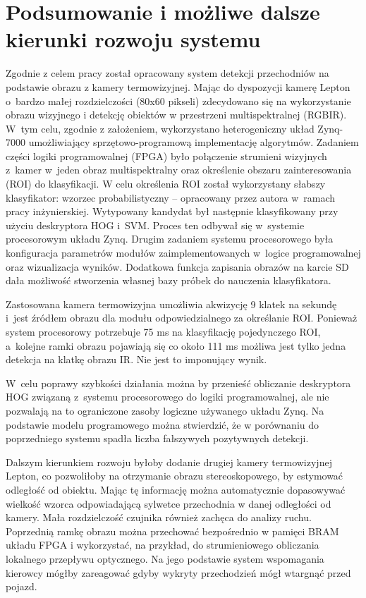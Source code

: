 \chapter{Podsumowanie i możliwe dalsze kierunki rozwoju systemu}

Zgodnie z celem pracy został opracowany system detekcji przechodniów na podstawie obrazu z kamery termowizyjnej. 
Mając do dyspozycji kamerę Lepton o~bardzo małej rozdzielczości (80x60 pikseli) zdecydowano się na wykorzystanie obrazu wizyjnego i detekcję obiektów w przestrzeni multispektralnej (RGBIR). 
W~tym celu, zgodnie z założeniem, wykorzystano heterogeniczny układ Zynq-7000 umożliwiający sprzętowo-programową implementację algorytmów.
Zadaniem części logiki programowalnej (FPGA) było połączenie strumieni wizyjnych z~kamer w~jeden obraz multispektralny oraz określenie obszaru zainteresowania (ROI) do klasyfikacji. 
W celu określenia ROI został wykorzystany słabszy klasyfikator: wzorzec probabilistyczny -- opracowany przez autora w~ramach pracy inżynierskiej. 
Wytypowany kandydat był następnie klasyfikowany przy użyciu deskryptora HOG i~SVM. 
Proces ten odbywał się w~systemie procesorowym układu Zynq. 
Drugim zadaniem systemu procesorowego była konfiguracja parametrów modułów zaimplementowanych w~logice programowalnej oraz wizualizacja wyników. 
Dodatkowa funkcja zapisania obrazów na karcie SD dała możliwość stworzenia własnej bazy próbek do nauczenia klasyfikatora.

Zastosowana kamera termowizyjna umożliwia akwizycję 9 klatek na sekundę i~jest źródłem obrazu dla modułu odpowiedzialnego za określanie ROI. 
Ponieważ system procesorowy potrzebuje 75 ms na klasyfikację pojedynczego ROI, a~kolejne ramki obrazu pojawiają się co około 111 ms możliwa jest tylko jedna detekcja na klatkę obrazu IR. 
Nie jest to imponujący wynik. %

W~celu poprawy szybkości działania można by przenieść obliczanie deskryptora HOG związaną z~systemu procesorowego do logiki programowalnej, ale nie pozwalają na to ograniczone zasoby logiczne używanego układu Zynq. 
Na podstawie modelu programowego można stwierdzić, że w porównaniu do poprzedniego systemu spadła liczba fałszywych pozytywnych detekcji. 

Dalszym kierunkiem rozwoju byłoby dodanie drugiej kamery termowizyjnej Lepton, co pozwoliłoby na otrzymanie obrazu stereoskopowego, by estymować odległość od obiektu. Mając tę informację można automatycznie dopasowywać wielkość wzorca odpowiadającą sylwetce przechodnia w danej odległości od kamery. Mała rozdzielczość czujnika również zachęca do analizy ruchu. Poprzednią ramkę obrazu można przechować bezpośrednio w pamięci BRAM układu FPGA i wykorzystać, na przykład, do strumieniowego obliczania lokalnego przepływu optycznego. Na jego podstawie system wspomagania kierowcy mógłby zareagować gdyby wykryty przechodzień mógł wtargnąć przed pojazd.
